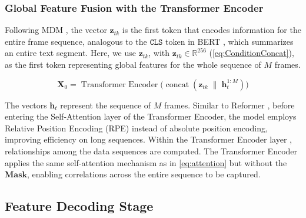 \subsubsection{Global Feature Fusion with the Transformer Encoder}
%

Following MDM \cite{tevet2022human}, the vector $\mathbf{z}_{tk}$ is the first token that encodes information for the entire frame sequence, analogous to the $\texttt{CLS}$ token in BERT \cite{devlin2019bertpretrainingdeepbidirectional}, which summarizes an entire text segment.
Here, we use $\mathbf{z}_{tk}$, with $\mathbf{z}_{tk} \in \mathbb{R}^{256}$ (\autoref{eq:ConditionConcat}), as the first token representing global features for the whole sequence of $M$ frames.

\begin{equation}
	\mathbf{X}_{0} = \operatorname{Transformer\ Encoder}\bigl(\operatorname{concat}(\mathbf{z}_{tk} \;\|\; \mathbf{h}^{1:M}_{t})\bigr)
	\label{eq:TransformerEncoder}
\end{equation}

The vectors $\mathbf{h}_t$ represent the sequence of $M$ frames. Similar to Reformer \cite{kitaev2020reformer}, before entering the Self-Attention layer of the Transformer Encoder, the model employs Relative Position Encoding (RPE) instead of absolute position encoding, improving efficiency on long sequences.
Within the Transformer Encoder layer \cite{vaswani2017attention}, relationships among the data sequences are computed.
The Transformer Encoder applies the same self-attention mechanism as in \autoref{eq:attention} but without the $\mathbf{Mask}$, enabling correlations across the entire sequence to be captured.





\subsection{Feature Decoding Stage}

